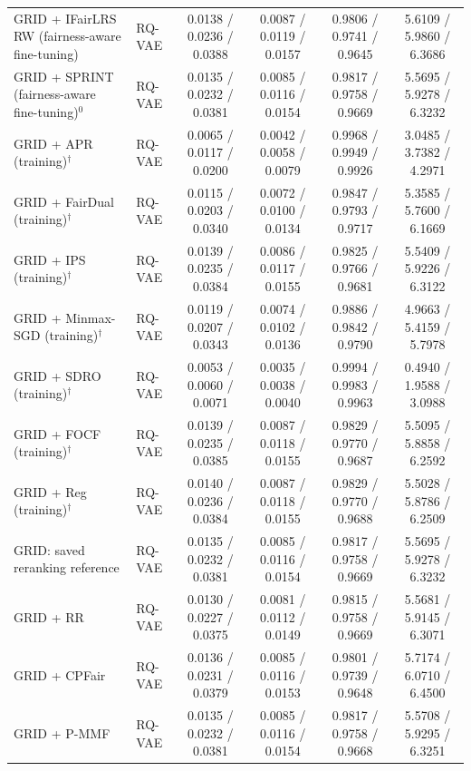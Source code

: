 \begin{table}[p]
{\begin{tabular}{llcccc}
GRID + IFairLRS RW (fairness-aware fine-tuning) & RQ-VAE & 0.0138 / 0.0236 / 0.0388 & 0.0087 / 0.0119 / 0.0157 & 0.9806 / 0.9741 / 0.9645 & 5.6109 / 5.9860 / 6.3686 \\
GRID + SPRINT (fairness-aware fine-tuning)$^{0}$ & RQ-VAE & 0.0135 / 0.0232 / 0.0381 & 0.0085 / 0.0116 / 0.0154 & 0.9817 / 0.9758 / 0.9669 & 5.5695 / 5.9278 / 6.3232 \\
GRID + APR (training)$^{\dagger}$ & RQ-VAE & 0.0065 / 0.0117 / 0.0200 & 0.0042 / 0.0058 / 0.0079 & 0.9968 / 0.9949 / 0.9926 & 3.0485 / 3.7382 / 4.2971 \\
GRID + FairDual (training)$^{\dagger}$ & RQ-VAE & 0.0115 / 0.0203 / 0.0340 & 0.0072 / 0.0100 / 0.0134 & 0.9847 / 0.9793 / 0.9717 & 5.3585 / 5.7600 / 6.1669 \\
GRID + IPS (training)$^{\dagger}$ & RQ-VAE & 0.0139 / 0.0235 / 0.0384 & 0.0086 / 0.0117 / 0.0155 & 0.9825 / 0.9766 / 0.9681 & 5.5409 / 5.9226 / 6.3122 \\
GRID + Minmax-SGD (training)$^{\dagger}$ & RQ-VAE & 0.0119 / 0.0207 / 0.0343 & 0.0074 / 0.0102 / 0.0136 & 0.9886 / 0.9842 / 0.9790 & 4.9663 / 5.4159 / 5.7978 \\
GRID + SDRO (training)$^{\dagger}$ & RQ-VAE & 0.0053 / 0.0060 / 0.0071 & 0.0035 / 0.0038 / 0.0040 & 0.9994 / 0.9983 / 0.9963 & 0.4940 / 1.9588 / 3.0988 \\
GRID + FOCF (training)$^{\dagger}$ & RQ-VAE & 0.0139 / 0.0235 / 0.0385 & 0.0087 / 0.0118 / 0.0155 & 0.9829 / 0.9770 / 0.9687 & 5.5095 / 5.8858 / 6.2592 \\
GRID + Reg (training)$^{\dagger}$ & RQ-VAE & 0.0140 / 0.0236 / 0.0384 & 0.0087 / 0.0118 / 0.0155 & 0.9829 / 0.9770 / 0.9688 & 5.5028 / 5.8786 / 6.2509 \\
GRID: saved reranking reference & RQ-VAE & 0.0135 / 0.0232 / 0.0381 & 0.0085 / 0.0116 / 0.0154 & 0.9817 / 0.9758 / 0.9669 & 5.5695 / 5.9278 / 6.3232 \\
GRID + RR & RQ-VAE & 0.0130 / 0.0227 / 0.0375 & 0.0081 / 0.0112 / 0.0149 & 0.9815 / 0.9758 / 0.9669 & 5.5681 / 5.9145 / 6.3071 \\
GRID + CPFair & RQ-VAE & 0.0136 / 0.0231 / 0.0379 & 0.0085 / 0.0116 / 0.0153 & 0.9801 / 0.9739 / 0.9648 & 5.7174 / 6.0710 / 6.4500 \\
GRID + P-MMF & RQ-VAE & 0.0135 / 0.0232 / 0.0381 & 0.0085 / 0.0116 / 0.0154 & 0.9817 / 0.9758 / 0.9668 & 5.5708 / 5.9295 / 6.3251 \\
\bottomrule
\end{tabular}%
}
\end{table}

